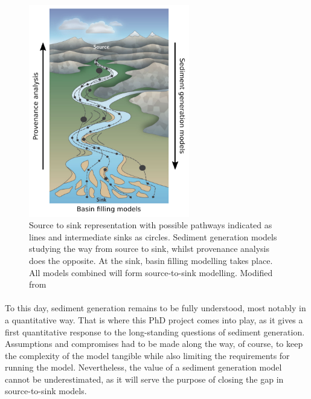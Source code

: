     \begin{figure}
        \centering
        \includegraphics[width=7cm]{chapters/01-introduction/figures/Source_to_sink.pdf}
        \caption[Source to sink representation]{Source to sink representation with possible pathways indicated as lines and intermediate sinks as circles. %
        Sediment generation models studying the way from source to sink, whilst provenance analysis does the opposite. %
        At the sink, basin filling modelling takes place. %
        All models combined will form source-to-sink modelling. %
        Modified from \textcite{Allen_2008}}
        \label{fig:source_to_sink}
    \end{figure}

    \paragraph*{}
    To this day, sediment generation remains to be fully understood, most notably in a quantitative way. %
    That is where this PhD project comes into play, as it gives a first quantitative response to the long-standing questions of sediment generation. %
    Assumptions and compromises had to be made along the way, of course, to keep the complexity of the model tangible while also limiting the requirements for running the model. %
    Nevertheless, the value of a sediment generation model cannot be underestimated, as it will serve the purpose of closing the gap in source-to-sink models. %


